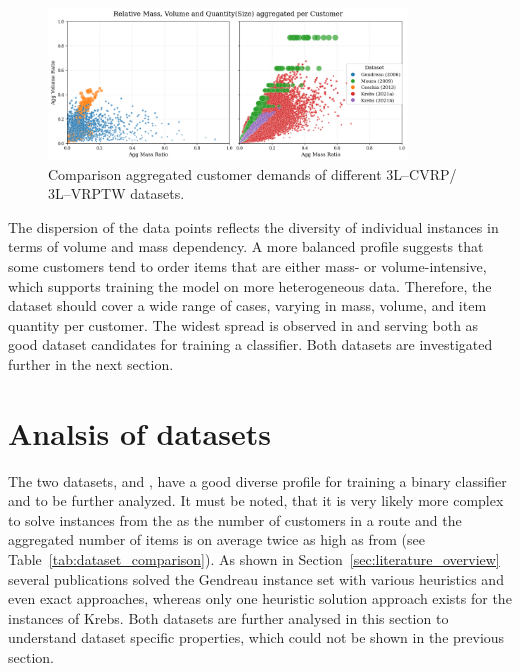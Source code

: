 \begin{figure}[ht]
    \centering
    \includegraphics[width=0.85\textwidth]{pictures/comparison_datasets_3lcvrp.png}
    \caption{Comparison aggregated customer demands of different 3L--CVRP/ 3L--VRPTW datasets.}
    \label{fig:dataset_comparison}
\end{figure}

The dispersion of the data points reflects the diversity of individual instances in terms of volume
and mass dependency. A more balanced profile suggests that some customers tend to order items that
are either mass- or volume-intensive, which supports training the model on more heterogeneous data.
Therefore, the dataset should cover a wide range of cases, varying in mass, volume, and item
quantity per customer. The widest spread is observed in \krebsADataSetText and \gendreauDataSetText serving
both as good dataset candidates for training a classifier. Both datasets are investigated further in
the next section.

\section{Analsis of datasets}
\label{sec:analysis_datasets}

The two datasets, \krebsADataSetText and \gendreauDataSetText, have a good diverse profile for training
a binary classifier and to be further analyzed. It must be noted, that it is very likely more complex
to solve instances from the \krebsADataSetText as the number of customers in a route and the
aggregated number of items is on average twice as high as from \gendreauDataSetText (see Table~\ref{tab:dataset_comparison}).
As shown in Section~\ref{sec:literature_overview} several publications solved the Gendreau instance set
with various heuristics and even exact approaches, whereas only one heuristic solution approach exists for the instances of Krebs.
Both datasets are further analysed in this section to understand dataset specific properties, which could not
be shown in the previous section.

